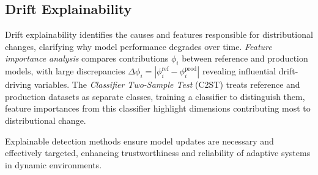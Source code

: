 \subsection{Drift Explainability}\label{subsec:drift_explainability}

Drift explainability identifies the causes and features responsible for
distributional changes, clarifying why model performance degrades over time.
\emph{Feature importance analysis} compares contributions $\phi_i$ between
reference and production models, with large discrepancies $\Delta \phi_i =
    |\phi_i^{\text{ref}} - \phi_i^{\text{prod}}|$ revealing influential
drift-driving variables. The \emph{Classifier Two-Sample Test} (C2ST) treats
reference and production datasets as separate classes, training a classifier to
distinguish them, feature importances from this classifier highlight dimensions
contributing most to distributional change.

Explainable detection methods ensure model updates are necessary and
effectively targeted, enhancing trustworthiness and reliability of adaptive
systems in dynamic environments.